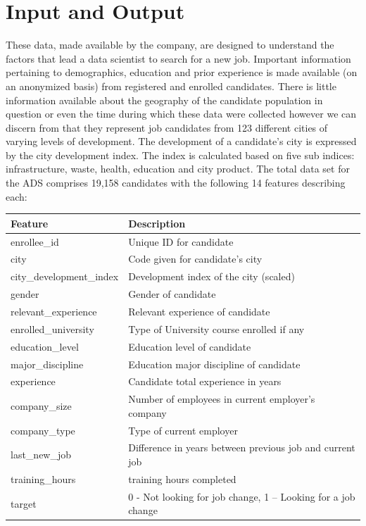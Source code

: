 \pagebreak

\section{Input and Output}

These data, made available by the company, are designed to understand the factors that lead a data scientist to search for a new job.  Important information pertaining to demographics, education and prior experience is made available (on an anonymized basis) from registered and enrolled candidates.  There is little information available about the geography of the candidate population in question or even the time during which these data were collected however we can discern from that they represent job candidates from 123 different cities of varying levels of development.  The development of a candidate's city is expressed by the city development index. The index is calculated based on five sub indices: infrastructure, waste, health, education and city product. The total data set for the ADS comprises 19,158 candidates with the following 14 features describing each:


\begin{table}[h]
\centering
\begin{tabular}{ |p{4cm}||p{10cm}|  }
 
 \hline
 Feature 		& Description		\\
 \hline
enrollee\_id 	& Unique ID for candidate\\
city			& Code given for candidate's city \\
city\_development\_index & Development index of the city (scaled)\\
gender		& Gender of candidate\\
relevant\_experience & Relevant experience of candidate\\
enrolled\_university & Type of University course enrolled if any \\

education\_level & Education level of candidate\\

major\_discipline & Education major discipline of candidate \\

experience 	& Candidate total experience in years\\

company\_size 	& Number of employees in current employer's company \\

company\_type 	& Type of current employer\\

last\_new\_job 	& Difference in years between previous job and current job \\

training\_hours 	& training hours completed \\

target 		& 0 - Not looking for job change, 1 – Looking for a job change\\
 \hline
\end{tabular}
\end{table}


